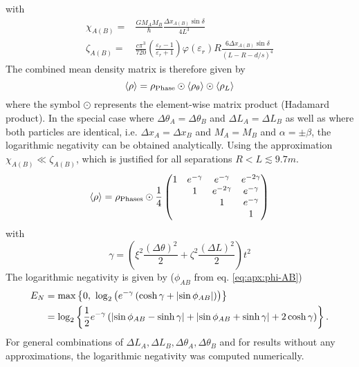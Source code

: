 with 
\begin{align}
  \chi_{A(B)} =& \frac{G M_A M_B}{\hbar}\frac{\Delta x_{A(B)}\sin\delta}{4L^3} \\ \label{eq:apx:definition-zeta}
  \zeta_{A(B)} =& \frac{c\pi^3}{720}\left(\frac{\varepsilon_r - 1}{\varepsilon_r + 1}\right)\varphi(\varepsilon_r) R \frac{6\Delta x_{A(B)} \sin\delta}{(L-R-d/s)^4}
\end{align}
The combined mean density matrix is therefore given by
\begin{equation}
  \left\langle\rho\right\rangle = \rho_\mathrm{Phase} \odot \left\langle\rho_{\theta}\right\rangle \odot \left\langle\rho_{L}\right\rangle
\end{equation}
where the symbol $\odot$ represents the element-wise matrix product (Hadamard product).
In the special case where $\Delta \theta_A = \Delta \theta_B$ and $\Delta L_A = \Delta L_B$ as well as where both particles are identical, i.e. $\Delta x_A = \Delta x_B$ and $M_A=M_B$ and $\alpha=\pm\beta$, the logarithmic negativity can be obtained analytically.
Using the approximation $\chi_{A(B)} \ll \zeta_{A(B)}$, which is justified for all separations $R < L \lesssim 9.7 \si{m}$.
\begin{equation}
  \left\langle\rho\right\rangle = \rho_\mathrm{Phases} \odot \frac{1}{4}\begin{pmatrix}
    1 & e^{-\gamma} & e^{-\gamma} & e^{-2\gamma} \\
    & 1 & e^{-2\gamma} & e^{-\gamma} \\
    & & 1 & e^{-\gamma} \\
    & & & 1
  \end{pmatrix}
\end{equation}
with 
\begin{equation}\label{eq:apx:stochastic-decoherence}
  \gamma = \left( \xi^2 \frac{(\Delta \theta)^2}{2} + \zeta^2 \frac{(\Delta L)^2}{2} \right) t^2
\end{equation}
The logarithmic negativity is given by ($\phi_{AB}$ from eq. \eqref{eq:apx:phi-AB})
\begin{align}\label{eq:apx:stochastic-variations-logarithmic-negativity}
  E_N &= \max\left\{0,\ \log_2\left(e^{-\gamma}\left(\cosh\gamma + \left\lvert\sin\phi_{AB}\right\rvert\right)\right)\right\} \\
  &= \log_2\left\{ \frac{1}{2} e^{-\gamma} \left(\left\lvert\sin\phi_{AB}-\sinh\gamma\right\rvert + \left\lvert\sin\phi_{AB}+\sinh\gamma\right\rvert + 2\cosh\gamma\right) \right\} .
\end{align}
For general combinations of $\Delta L_A, \Delta L_B, \Delta \theta_A, \Delta \theta_B$ and for results without any approximations, the logarithmic negativity was computed numerically. 




